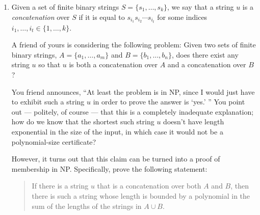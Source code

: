 \documentclass[12pt]{article}
\begin{document}
\begin{enumerate}
{}


\item

Given a set of finite binary strings $S = \{s_1, \ldots, s_k\}$,
we say that a string $u$ is a {\em concatenation} over $S$
if it is equal to $s_{i_1} s_{i_2} \cdots s_{i_t}$
for some indices $i_1, \ldots, i_t \in \{1, \ldots, k\}$.

A friend of yours is considering the following problem:
Given two sets of finite binary strings, $A = \{a_1, \ldots, a_m\}$
and $B = \{b_1, \ldots, b_n\}$,
does there exist any string $u$ so that $u$ is both
a concatenation over $A$ and a concatenation over $B$?

You friend announces, ``At least the problem is in NP,
since I would just have to exhibit such a string $u$ in order
to prove the answer is `yes.' ''
You point out --- politely, of course --- that this is
a completely inadequate explanation; how do we know that
the shortest such string
$u$ doesn't have length exponential in the size of the input,
in which case it would not be a polynomial-size certificate?

However, it turns out that this claim can be turned
into a proof of membership in NP.
Specifically, prove the following statement:
\begin{quote}
If there is a string $u$ that is a concatenation over both $A$ and $B$,
then there is such a string whose length is bounded by
a polynomial in the sum of the lengths of the strings in $A \cup B$.
\end{quote}

\end{enumerate}
\end{document}
